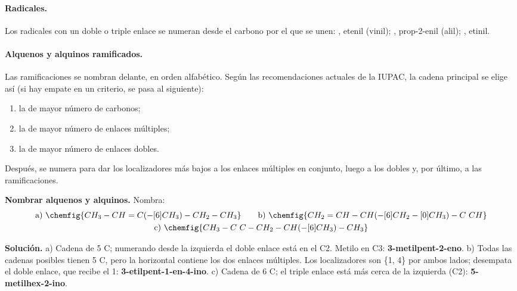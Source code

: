 \paragraph{Radicales.} Los radicales con un doble o triple enlace se numeran desde el carbono por el que se unen: ,
etenil (vinil); , prop-2-enil (alil); , etinil.

\paragraph{Alquenos y alquinos ramificados.} Las ramificaciones se nombran delante, en orden alfabético. Según las recomendaciones
actuales de la IUPAC, la cadena principal se elige así (si hay empate en un criterio, se pasa al siguiente):
\begin{enumerate}
    \item la de mayor número de carbonos;
    \item la de mayor número de enlaces múltiples;
    \item la de mayor número de enlaces dobles.
\end{enumerate}
Después, se numera para dar los localizadores más bajos a los enlaces múltiples en conjunto, luego a los dobles y, por último, a
las ramificaciones.

\begin{example}
    \textbf{Nombrar alquenos y alquinos.} Nombra:
    \begin{gather*}
        \text{a)}\ \chemfig{CH_3-CH=C(-[6]CH_3)-CH_2-CH_3} \qquad \text{b)}\ \chemfig{CH_2=CH-CH(-[6]CH_2-[0]CH_3)-C~CH} \\
        \text{c)}\ \chemfig{CH_3-C~C-CH_2-CH(-[6]CH_3)-CH_3}
    \end{gather*}

    \textbf{Solución.} a) Cadena de 5 C; numerando desde la izquierda el doble enlace está en el C2. Metilo en C3:
    \textbf{3-metilpent-2-eno}. b) Todas las cadenas posibles tienen 5 C, pero la horizontal contiene los dos enlaces múltiples. Los
    localizadores son \{1, 4\} por ambos lados; desempata el doble enlace, que recibe el 1: \textbf{3-etilpent-1-en-4-ino}. c)
    Cadena de 6 C; el triple enlace está más cerca de la izquierda (C2): \textbf{5-metilhex-2-ino}.
\end{example}

